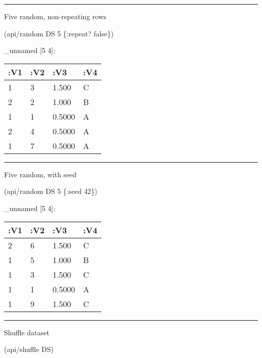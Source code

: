 \documentclass[]{article}
\newenvironment{Shaded}{\begin{snugshade}}{\end{snugshade}}
\newcommand{\DecValTok}[1]{\textcolor[rgb]{0.00,0.00,0.81}{#1}}
\newcommand{\VariableTok}[1]{\textcolor[rgb]{0.00,0.00,0.00}{#1}}
\newcommand{\AttributeTok}[1]{\textcolor[rgb]{0.77,0.63,0.00}{#1}}
\newcommand{\NormalTok}[1]{#1}
\begin{document}
\begin{center}\rule{0.5\linewidth}{0.5pt}\end{center}

Five random, non-repeating rows

\begin{Shaded}
\begin{Highlighting}[]
\NormalTok{(api/random DS }\DecValTok{5}\NormalTok{ \{}\AttributeTok{:repeat}\NormalTok{? }\VariableTok{false}\NormalTok{\})}
\end{Highlighting}
\end{Shaded}

\_unnamed {[}5 4{]}:

\begin{longtable}[]{@{}llll@{}}
\toprule
:V1 & :V2 & :V3 & :V4\tabularnewline
\midrule
\endhead
1 & 3 & 1.500 & C\tabularnewline
2 & 2 & 1.000 & B\tabularnewline
1 & 1 & 0.5000 & A\tabularnewline
2 & 4 & 0.5000 & A\tabularnewline
1 & 7 & 0.5000 & A\tabularnewline
\bottomrule
\end{longtable}

\begin{center}\rule{0.5\linewidth}{0.5pt}\end{center}

Five random, with seed

\begin{Shaded}
\begin{Highlighting}[]
\NormalTok{(api/random DS }\DecValTok{5}\NormalTok{ \{}\AttributeTok{:seed} \DecValTok{42}\NormalTok{\})}
\end{Highlighting}
\end{Shaded}

\_unnamed {[}5 4{]}:

\begin{longtable}[]{@{}llll@{}}
\toprule
:V1 & :V2 & :V3 & :V4\tabularnewline
\midrule
\endhead
2 & 6 & 1.500 & C\tabularnewline
1 & 5 & 1.000 & B\tabularnewline
1 & 3 & 1.500 & C\tabularnewline
1 & 1 & 0.5000 & A\tabularnewline
1 & 9 & 1.500 & C\tabularnewline
\bottomrule
\end{longtable}

\begin{center}\rule{0.5\linewidth}{0.5pt}\end{center}

Shuffle dataset

\begin{Shaded}
\begin{Highlighting}[]
\NormalTok{(api/shuffle DS)}
\end{Highlighting}
\end{Shaded}
\end{document}
